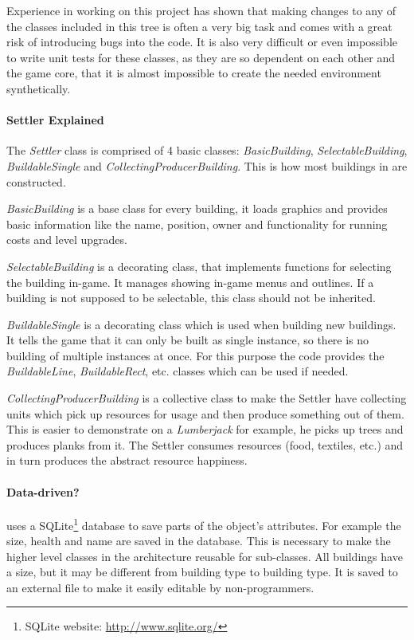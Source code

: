 Experience in working on this project has shown that making changes to any of the classes included in this tree is often
a very big task and comes with a great risk of introducing bugs into the code. It is also very difficult or even
impossible to write unit tests for these classes, as they are so dependent on each other and the game core, that it is
almost impossible to create the needed environment synthetically.

\paragraph{Settler Explained}
The \textit{Settler} class is comprised of 4 basic classes: \textit{BasicBuilding}, \textit{SelectableBuilding},
\textit{BuildableSingle} and \textit{CollectingProducerBuilding}. This is how most buildings in \UH{} are constructed. 

\textit{BasicBuilding} is a base class for every building, it loads graphics and provides
basic information like the name, position, owner and functionality for running costs and level upgrades.

\textit{SelectableBuilding} is a decorating class, that implements functions for selecting the building in-game. It
manages showing in-game menus and outlines. If a building is not supposed to be selectable, this class should not be
inherited.

\textit{BuildableSingle} is a decorating class which is used when building new buildings. It tells the game that it can
only be built as single instance, so there is no building of multiple instances at once. For this purpose the code
provides the \textit{BuildableLine}, \textit{BuildableRect}, etc. classes which can be used if needed.

\textit{CollectingProducerBuilding} is a collective class to make the Settler have collecting units which pick up
resources for usage and then produce something out of them. This is easier to demonstrate on a \textit{Lumberjack} for
example, he picks up trees and produces planks from it. The Settler consumes resources (food, textiles, etc.) and in
turn produces the abstract resource happiness.

\paragraph{Data-driven?}
\UH{} uses a SQLite\footnote{SQLite website: \url{http://www.sqlite.org/}} database to save parts of the object's
attributes. For example the size, health and name are saved in the database. This is necessary to make the higher level
classes in the architecture reusable for sub-classes. All buildings have a size, but it may be different from building
type to building type. It is saved to an external file to make it easily editable by non-programmers.

